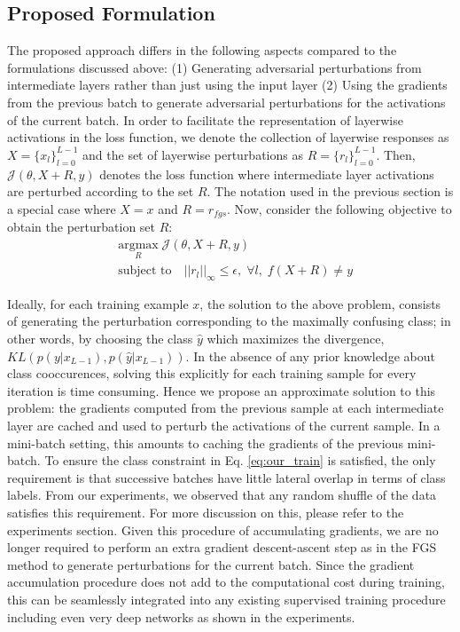 \subsection{Proposed Formulation}\label{subsec:formulation}
The proposed approach differs in the following aspects compared to the formulations discussed above: (1) Generating adversarial perturbations from intermediate layers rather than just using the input layer (2) Using the gradients from the previous batch to generate adversarial perturbations for the activations of the current batch. In order to facilitate the representation of layerwise activations in the loss function, we denote the collection of layerwise responses as $X=\{x_l\}_{l=0}^{L-1}$ and  the set of layerwise perturbations as $R=\{r_l\}_{l=0}^{L-1}$. Then, $\mathcal{J}(\theta,X+R,y)$ denotes the loss function where intermediate layer activations are perturbed according to the set $R$. The notation used in the previous section is a special case where $X={x}$ and $R=r_{fgs}$. Now, consider the following objective to obtain the perturbation set $R$: 
\begin{equation}
\begin{aligned}
& \underset{R}{\text{argmax}} \; \mathcal{J}(\theta,X+R,y) \\
& \text{subject to} \quad ||r_{l}||_{\infty} \leq \epsilon, \; \forall l, \; f(X+R) \neq y
\label{eq:our_train}
\end{aligned}
\end{equation}

Ideally, for each training example $x$, the solution to the above problem, consists of generating the perturbation corresponding to the maximally confusing class; in other words, by choosing the class $\hat{y}$ which maximizes the divergence, $KL(p(y|x_{L-1}),p(\hat{y}|x_{L-1}))$.  In the absence of any prior knowledge about class cooccurences, solving this explicitly for each training sample for every iteration is time consuming. Hence we propose an approximate solution to this problem: the gradients computed from the previous sample at each intermediate layer are cached and used to perturb the activations of the current sample. In a mini-batch setting, this amounts to caching the gradients of the previous mini-batch. To ensure the class constraint in Eq. \ref{eq:our_train} is satisfied, the only requirement is that successive batches have little lateral overlap in terms of class labels. From our experiments, we observed that any random shuffle of the data satisfies this requirement. For more discussion on this, please refer to the experiments section. Given this procedure of accumulating gradients, we are no longer required to perform an extra gradient descent-ascent step as in the FGS method to generate perturbations for the current batch. Since the gradient accumulation procedure does not add to the computational cost during training, this can be seamlessly integrated into any existing supervised training procedure including even very deep networks as shown in the experiments. 

